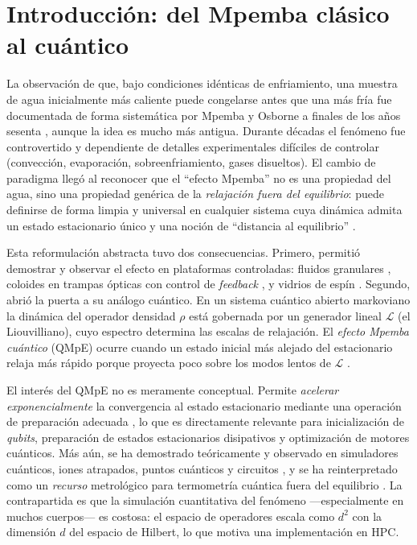 \documentclass[11pt,a4paper]{article}
\theoremstyle{definition}
\theoremstyle{plain}
\newcommand{\Lop}{\mathcal{L}}
\begin{document}
\section{Introducción: del Mpemba clásico al cuántico}

La observación de que, bajo condiciones idénticas de enfriamiento, una muestra de agua inicialmente más
caliente puede congelarse antes que una más fría fue documentada de forma sistemática por Mpemba y Osborne
a finales de los años sesenta \cite{MpembaOsborne1969}, aunque la idea es mucho más antigua. Durante décadas
el fenómeno fue controvertido y dependiente de detalles experimentales difíciles de controlar
(convección, evaporación, sobreenfriamiento, gases disueltos). El cambio de paradigma llegó al reconocer
que el ``efecto Mpemba'' no es una propiedad del agua, sino una propiedad genérica de la \emph{relajación
fuera del equilibrio}: puede definirse de forma limpia y universal en cualquier sistema cuya dinámica
admita un estado estacionario único y una noción de ``distancia al equilibrio'' \cite{LuRaz2017,KlichRaz2019,Bechhoefer2021,Teza2026}.

Esta reformulación abstracta tuvo dos consecuencias. Primero, permitió demostrar y observar el efecto en
plataformas controladas: fluidos granulares \cite{Lasanta2017,Biswas2020}, coloides en trampas ópticas con
control de \emph{feedback} \cite{KumarBechhoefer2020,Kumar2022}, y vidrios de espín
\cite{BaityJesi2019}. Segundo, abrió la puerta a su análogo cuántico. En un sistema cuántico abierto
markoviano la dinámica del operador densidad $\rho$ está gobernada por un generador lineal $\Lop$ (el
Liouvilliano), cuyo espectro determina las escalas de relajación. El \emph{efecto Mpemba cuántico} (QMpE)
ocurre cuando un estado inicial más alejado del estacionario relaja más rápido porque proyecta poco sobre
los modos lentos de $\Lop$ \cite{Carollo2021,KumarLutz2020,Nava2024,Moroder2024,AresCalabreseMurciano2025}.

El interés del QMpE no es meramente conceptual. Permite \emph{acelerar exponencialmente} la convergencia al
estado estacionario mediante una operación de preparación adecuada \cite{Carollo2021,Kochsiek2022},
lo que es directamente relevante para inicialización de \emph{qubits}, preparación de estados estacionarios
disipativos y optimización de motores cuánticos. Más aún, se ha demostrado teóricamente y observado en
simuladores cuánticos, iones atrapados, puntos cuánticos y circuitos
\cite{Joshi2024,AharonyShapira2024,Zhang2025,Chatterjee2023,Liu2024}, y se ha reinterpretado como un
\emph{recurso} metrológico para termometría cuántica fuera del equilibrio
\cite{Chattopadhyay2026,LiYang2026}. La contrapartida es que la simulación cuantitativa del fenómeno
—especialmente en muchos cuerpos— es costosa: el espacio de operadores escala como $d^2$ con la dimensión
$d$ del espacio de Hilbert, lo que motiva una implementación en HPC.
\end{document}

